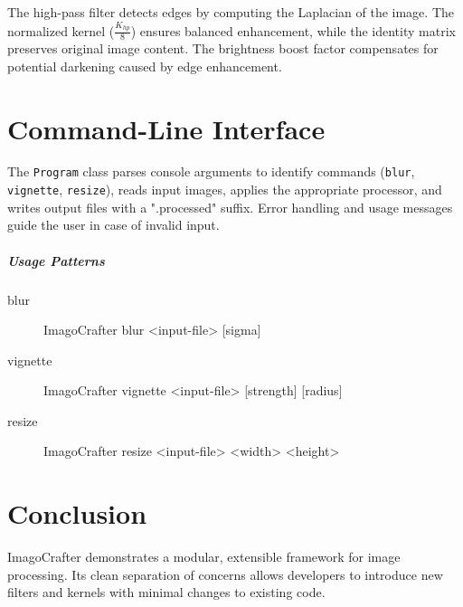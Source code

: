 \documentclass[12pt,a4paper]{report}
\begin{document}
The high-pass filter detects edges by computing the Laplacian of the image. The normalized kernel ($\frac{K_{hp}}{8}$) ensures balanced enhancement, while the identity matrix preserves original image content. The brightness boost factor compensates for potential darkening caused by edge enhancement.

\chapter{Command-Line Interface}
The \texttt{Program} class parses console arguments to identify commands (\texttt{blur}, \texttt{vignette}, \texttt{resize}), reads input images, applies the appropriate processor, and writes output files with a ".processed" suffix. Error handling and usage messages guide the user in case of invalid input.

\paragraph{Usage Patterns}
\begin{description}
  \item[blur]  ImagoCrafter blur <input-file> [sigma]
  \item[vignette]  ImagoCrafter vignette <input-file> [strength] [radius]
  \item[resize]  ImagoCrafter resize <input-file> <width> <height>
\end{description}

\chapter{Conclusion}
ImagoCrafter demonstrates a modular, extensible framework for image processing. Its clean separation of concerns allows developers to introduce new filters and kernels with minimal changes to existing code.
\end{document}
